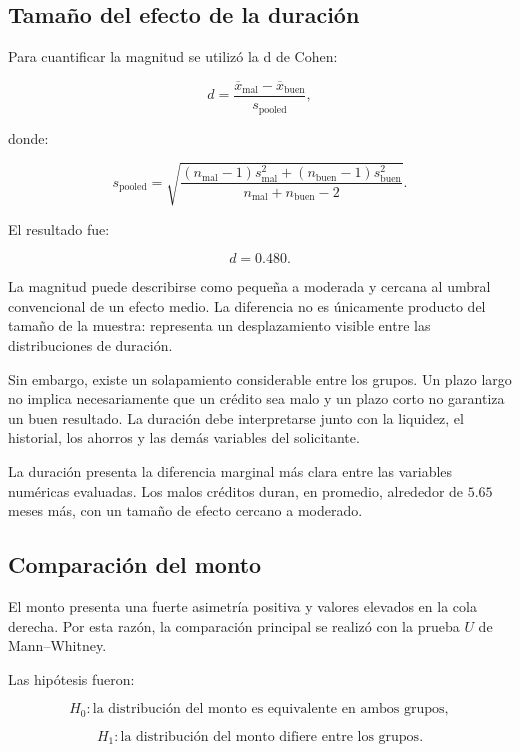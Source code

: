 \subsection{Tamaño del efecto de la duración}

Para cuantificar la magnitud se utilizó la d de Cohen:

\[
d
=
\frac{
    \overline{x}_{\mathrm{mal}}
    -
    \overline{x}_{\mathrm{buen}}
}{
    s_{\mathrm{pooled}}
},
\]

donde:

\[
s_{\mathrm{pooled}}
=
\sqrt{
    \frac{
        (n_{\mathrm{mal}}-1)s_{\mathrm{mal}}^2
        +
        (n_{\mathrm{buen}}-1)s_{\mathrm{buen}}^2
    }{
        n_{\mathrm{mal}}+n_{\mathrm{buen}}-2
    }
}.
\]

El resultado fue:

\[
d=0.480.
\]

La magnitud puede describirse como pequeña a moderada y cercana al umbral
convencional de un efecto medio. La diferencia no es únicamente producto
del tamaño de la muestra: representa un desplazamiento visible entre las
distribuciones de duración.

Sin embargo, existe un solapamiento considerable entre los grupos. Un
plazo largo no implica necesariamente que un crédito sea malo y un plazo
corto no garantiza un buen resultado. La duración debe interpretarse
junto con la liquidez, el historial, los ahorros y las demás variables
del solicitante.

\begin{hallazgo}
La duración presenta la diferencia marginal más clara entre las variables
numéricas evaluadas. Los malos créditos duran, en promedio, alrededor de
\(5.65\) meses más, con un tamaño de efecto cercano a moderado.
\end{hallazgo}

\subsection{Comparación del monto}

El monto presenta una fuerte asimetría positiva y valores elevados en la
cola derecha. Por esta razón, la comparación principal se realizó con la
prueba \(U\) de Mann--Whitney.

Las hipótesis fueron:

\[
H_0:
\text{la distribución del monto es equivalente en ambos grupos},
\]

\[
H_1:
\text{la distribución del monto difiere entre los grupos}.
\]

